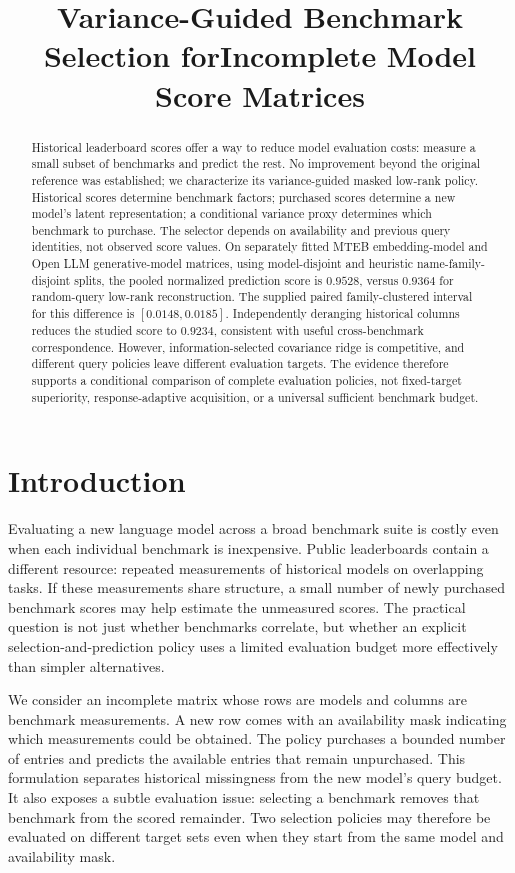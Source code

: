 \documentclass{article}
\title{Variance-Guided Benchmark Selection for\newline Incomplete Model Score Matrices}
\author{}
\begin{document}
\maketitle

\begin{abstract}
Historical leaderboard scores offer a way to reduce model evaluation costs: measure a small subset of benchmarks and predict the rest. No improvement beyond the original reference was established; we characterize its variance-guided masked low-rank policy. Historical scores determine benchmark factors; purchased scores determine a new model's latent representation; a conditional variance proxy determines which benchmark to purchase. The selector depends on availability and previous query identities, not observed score values. On separately fitted MTEB embedding-model and Open LLM generative-model matrices, using model-disjoint and heuristic name-family-disjoint splits, the pooled normalized prediction score is $0.9528$, versus $0.9364$ for random-query low-rank reconstruction. The supplied paired family-clustered interval for this difference is $[0.0148,0.0185]$. Independently deranging historical columns reduces the studied score to $0.9234$, consistent with useful cross-benchmark correspondence. However, information-selected covariance ridge is competitive, and different query policies leave different evaluation targets. The evidence therefore supports a conditional comparison of complete evaluation policies, not fixed-target superiority, response-adaptive acquisition, or a universal sufficient benchmark budget.
\end{abstract}

\section{Introduction}
Evaluating a new language model across a broad benchmark suite is costly even when each individual benchmark is inexpensive. Public leaderboards contain a different resource: repeated measurements of historical models on overlapping tasks. If these measurements share structure, a small number of newly purchased benchmark scores may help estimate the unmeasured scores. The practical question is not just whether benchmarks correlate, but whether an explicit selection-and-prediction policy uses a limited evaluation budget more effectively than simpler alternatives.

We consider an incomplete matrix whose rows are models and columns are benchmark measurements. A new row comes with an availability mask indicating which measurements could be obtained. The policy purchases a bounded number of entries and predicts the available entries that remain unpurchased. This formulation separates historical missingness from the new model's query budget. It also exposes a subtle evaluation issue: selecting a benchmark removes that benchmark from the scored remainder. Two selection policies may therefore be evaluated on different target sets even when they start from the same model and availability mask.
\end{document}
